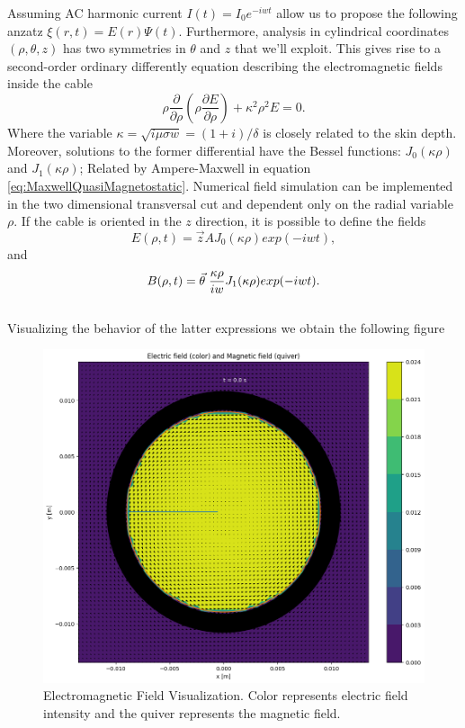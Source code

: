 Assuming AC harmonic current $I(t)=I_0 e^{-iwt}$ allow us to propose the following anzatz $\xi(r,t)=E(r) \Psi(t)$. Furthermore, analysis in cylindrical coordinates $(\rho,\theta,z)$ has two symmetries in $\theta$ and $z$ that we'll exploit. This gives rise to a second-order ordinary differently equation describing the electromagnetic fields inside the cable 
\begin{equation}
\label{eq:diff-eqq-cylindrical}
    \rho \frac{\partial}{\partial \rho} (\rho \frac{\partial E}{\partial \rho}) + \kappa^2 \rho^2 E = 0 .
\end{equation}
Where the variable $\kappa = \sqrt{i\mu\sigma w} = (1+i)/\delta$ is closely related to the skin depth. Moreover, solutions to the former differential have the Bessel functions: $J_0(\kappa\rho)$ and $J_1(\kappa\rho)$; Related by Ampere-Maxwell in equation \ref{eq:MaxwellQuasiMagnetostatic}. Numerical field simulation can be implemented in the two dimensional transversal cut and dependent only on the radial variable $\rho$. If the cable is oriented in the $z$ direction, it is possible to define the fields
\begin{equation}
    E(\rho, t) = \Vec{z}  A J_0(\kappa \rho) exp(-iwt),
\end{equation}
and
\begin{equation}
    B(\rho, t) =  \Vec{\theta} \hspace{ 0.1cm} \frac{\kappa \rho}{iw} J_1(\kappa \rho) exp(-iwt).
\end{equation}
\\
Visualizing the behavior of the latter expressions we obtain the following figure
\begin{figure}[H]
    \centering
    \includegraphics[scale=0.35]{Figures/em-fields-cable.png}
    \caption{Electromagnetic Field Visualization. Color represents electric field intensity and the quiver represents the magnetic field.}
    \label{fig:emfields-colorquiver}
\end{figure}

